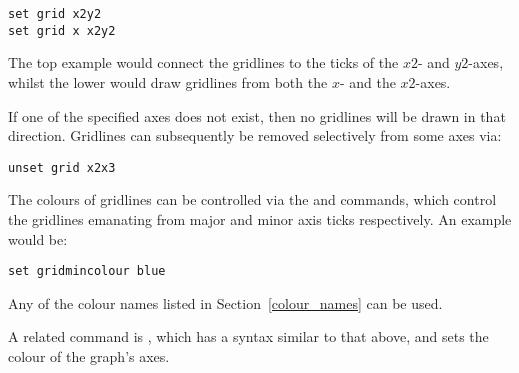 \begin{verbatim}
set grid x2y2
set grid x x2y2
\end{verbatim}

\noindent The top example would connect the gridlines to the ticks of the $x2$-
and $y2$-axes, whilst the lower would draw gridlines from both the $x$- and the
$x2$-axes.

If one of the specified axes does not exist, then no gridlines will be drawn in
that direction.  Gridlines can subsequently be removed selectively from some
axes via:

\begin{verbatim}
unset grid x2x3
\end{verbatim}

The colours of gridlines can be
controlled via the  and  commands, which control the gridlines emanating from major and
minor axis ticks respectively. An example would be:

\begin{verbatim}
set gridmincolour blue
\end{verbatim}

\noindent Any of the colour names listed in Section~\ref{colour_names} can be
used.

A related command is , which has a syntax similar to that above, and sets the colour of
the graph's axes.\label{set_colours}

